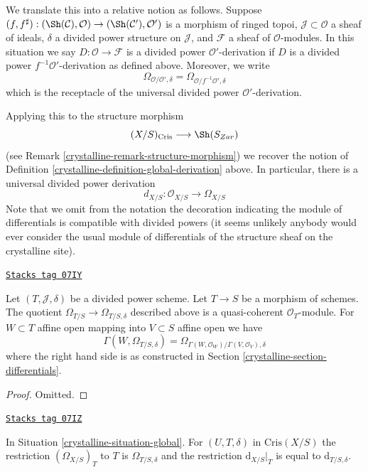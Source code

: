 \medskip\noindent
We translate this into a relative notion as follows. Suppose
$(f, f^\sharp) : (\Sh(\mathcal{C}), \mathcal{O}) \to
(\Sh(\mathcal{C}'), \mathcal{O}')$ is a morphism of ringed topoi,
$\mathcal{J} \subset \mathcal{O}$ a sheaf of ideals, $\delta$ a
divided power structure on $\mathcal{J}$, and $\mathcal{F}$ a sheaf
of $\mathcal{O}$-modules. In this situation we say
$D : \mathcal{O} \to \mathcal{F}$ is a divided power $\mathcal{O}'$-derivation
if $D$ is a divided power $f^{-1}\mathcal{O}'$-derivation as defined above.
Moreover, we write
$$
\Omega_{\mathcal{O}/\mathcal{O}', \delta} =
\Omega_{\mathcal{O}/f^{-1}\mathcal{O}', \delta}
$$
which is the receptacle of the universal divided power
$\mathcal{O}'$-derivation.

\medskip\noindent
Applying this to the structure morphism
$$
(X/S)_{\text{Cris}} \longrightarrow \Sh(S_{Zar})
$$
(see Remark \ref{crystalline-remark-structure-morphism}) we recover the notion of
Definition \ref{crystalline-definition-global-derivation} above.
In particular, there is a universal divided power derivation
$$
d_{X/S} : \mathcal{O}_{X/S} \to \Omega_{X/S}
$$
Note that we omit from the notation the decoration indicating the
module of differentials is compatible with divided powers (it seems
unlikely anybody would ever consider the usual module of differentials
of the structure sheaf on the crystalline site).

\begin{lemma}
\label{crystalline-lemma-module-differentials-divided-power-scheme}
\href{https://stacks.math.columbia.edu/tag/07IY}{\texttt{Stacks tag 07IY}}

Let $(T, \mathcal{J}, \delta)$ be a divided power scheme.
Let $T \to S$ be a morphism of schemes.
The quotient $\Omega_{T/S} \to \Omega_{T/S, \delta}$
described above is a quasi-coherent $\mathcal{O}_T$-module.
For $W \subset T$ affine open mapping into $V \subset S$ affine open
we have
$$
\Gamma(W, \Omega_{T/S, \delta}) =
\Omega_{\Gamma(W, \mathcal{O}_W)/\Gamma(V, \mathcal{O}_V), \delta}
$$
where the right hand side is
as constructed in Section \ref{crystalline-section-differentials}.
\end{lemma}

\begin{proof}
Omitted.
\end{proof}

\begin{lemma}
\label{crystalline-lemma-module-of-differentials}
\href{https://stacks.math.columbia.edu/tag/07IZ}{\texttt{Stacks tag 07IZ}}

In Situation \ref{crystalline-situation-global}.
For $(U, T, \delta)$ in $\text{Cris}(X/S)$ the restriction
$(\Omega_{X/S})_T$ to $T$ is $\Omega_{T/S, \delta}$ and the restriction
$\text{d}_{X/S}|_T$ is equal to $\text{d}_{T/S, \delta}$.
\end{lemma}

